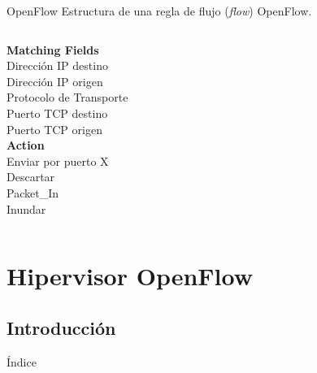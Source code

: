 \documentclass{beamer}
\begin{document}
\begin{frame}[t]{OpenFlow}
    Estructura de una regla de flujo (\textit{flow}) OpenFlow.\vspace{30pt}
    \begin{columns}[t]
    \column{1.9in}
    \textbf{Matching Fields}\\
    Dirección IP destino \\
    Dirección IP origen\\
    Protocolo de Transporte\\
    Puerto TCP destino\\
    Puerto TCP origen\\
    \column{1.9in}
    \textbf{Action}\\
    Enviar por puerto X\\
    Descartar\\
    Packet\_In\\
    Inundar\\
    \end{columns}

    \vspace{40pt}
    \begin{overlayarea}{\textwidth}{2cm}
    \end{overlayarea}
\end{frame}

\section{Hipervisor OpenFlow}
\subsection{Introducción}
\begin{frame}{Índice}
    \begin{columns}[t]
        \begin{column}{1.7in}
            \tableofcontents[currentsection, subsectionstyle=show/shaded/hide, sections={1-4}]
        \end{column}
        \begin{column}{1.7in}
            \tableofcontents[currentsection, subsectionstyle=show/shaded/hide, sections={5-7}]
        \end{column}
    \end{columns}
\end{frame}
\end{document}
